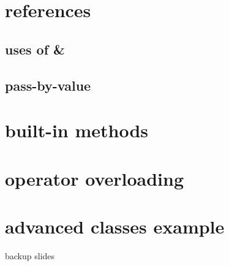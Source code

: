 

\section{references}

%



\subsection{uses of \&}



\subsection{pass-by-value}

%





\section{built-in methods}



\section{operator overloading}




\section{advanced classes example}





\begin{frame}{backup slides}
\end{frame}


